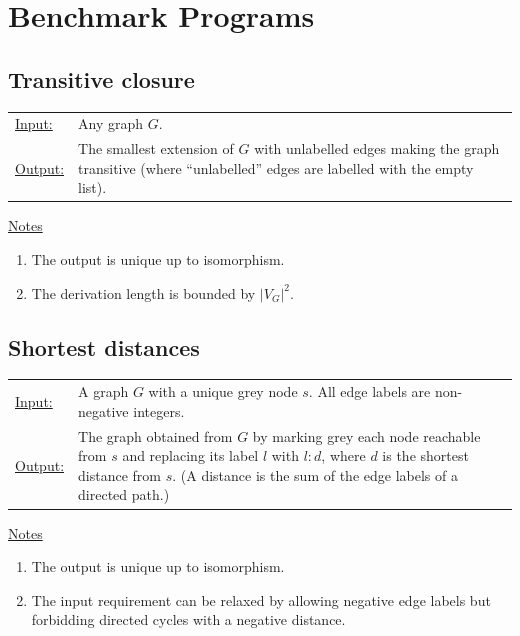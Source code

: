 \section{Benchmark Programs}
\label{sec:benchmark}
 

\subsection{Transitive closure}

\begin{tabular}{lp{10.5cm}}
\ul{Input:} & Any graph $G$. \\
\ul{Output:} & The smallest extension of $G$ with unlabelled edges making the graph transitive (where ``unlabelled'' edges are labelled with the empty list).
\end{tabular}
  
\begin{center}

\end{center}

\ul{Notes}
\begin{enumerate}
\setlength{\itemsep}{-.5ex}
\item The output is unique up to isomorphism.
\item The derivation length is bounded by $|V_G|^2$.
\end{enumerate}


\subsection{Shortest distances}

\begin{tabular}{lp{10.5cm}}
\ul{Input:} & A graph $G$ with a unique grey node $s$. All edge labels are non-negative integers. \\
\ul{Output:} & The graph obtained from $G$ by marking grey each node reachable from $s$ and replacing its label $l$\/ with $l{:}d$, where $d$\/ is the shortest distance from $s$. (A distance is the sum of the edge labels of a directed path.)
\end{tabular}
  
\begin{center}

\end{center}

\ul{Notes}
\begin{enumerate}
\setlength{\itemsep}{-.5ex}
\item The output is unique up to isomorphism.
\item The input requirement can be relaxed by allowing negative edge labels but forbidding directed cycles with a negative distance.
\end{enumerate}


